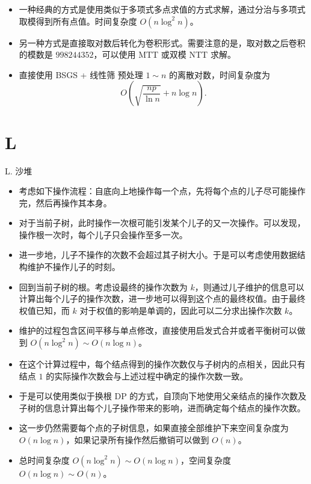 \documentclass[9pt]{ctexbeamer}
\newcommand{\setParDis}{\setlength{\parskip}{6pt}}
\begin{document}
\begin{frame}
\setParDis

\begin{itemize}
	\item 一种经典的方式是使用类似于多项式多点求值的方式求解，通过分治与多项式取模得到所有点值。时间复杂度 $O(n \log ^ 2 n)$。
	\item 另一种方式是直接取对数后转化为卷积形式。需要注意的是，取对数之后卷积的模数是 $998244352$，可以使用 MTT 或双模 NTT 求解。
	\item 直接使用 BSGS + 线性筛 预处理 $1 \sim n$ 的离散对数，时间复杂度为 \[O\left(\sqrt{\frac{np}{\ln n}} + n\log n\right).\]
\end{itemize}

\end{frame}

\section{L}

\begin{frame}
\setParDis

L. 沙堆

\begin{itemize}
	\item 考虑如下操作流程：自底向上地操作每一个点，先将每个点的儿子尽可能操作完，然后再操作其本身。
	\item 对于当前子树，此时操作一次根可能引发某个儿子的又一次操作。可以发现，操作根一次时，每个儿子只会操作至多一次。
	\item 进一步地，儿子不操作的次数不会超过其子树大小。于是可以考虑使用数据结构维护不操作儿子的时刻。
	\item 回到当前子树的根。考虑设最终的操作次数为 $k$，则通过儿子维护的信息可以计算出每个儿子的操作次数，进一步地可以得到这个点的最终权值。由于最终权值已知，而 $k$ 对于权值的影响是单调的，因此可以二分求出操作次数 $k$。
	\item 维护的过程包含区间平移与单点修改，直接使用启发式合并或者平衡树可以做到 $O(n \log ^ 2 n) \sim O(n \log n)$。
\end{itemize}

\end{frame}

\begin{frame}
\setParDis

\begin{itemize}
	\item 在这个计算过程中，每个结点得到的操作次数仅与子树内的点相关，因此只有结点 $1$ 的实际操作次数会与上述过程中确定的操作次数一致。
	\item 于是可以使用类似于换根 DP 的方式，自顶向下地使用父亲结点的操作次数及子树的信息计算出每个儿子操作带来的影响，进而确定每个结点的操作次数。
	\item 这一步仍然需要每个点的子树信息，如果直接全部维护下来空间复杂度为 $O(n \log n)$，如果记录所有操作然后撤销可以做到 $O(n)$。
	\item 总时间复杂度 $O(n \log ^ 2 n) \sim O(n \log n)$，空间复杂度 $O(n \log n) \sim O(n)$。
\end{itemize}

\end{frame}
\end{document}
